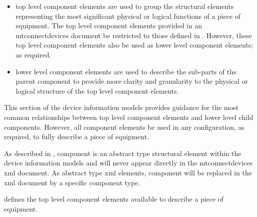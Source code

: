 \begin{itemize}

\item \gls{top level} \gls{component} elements are used to group the \glspl{structural element} representing the most significant physical or logical functions of a piece of equipment.  The \gls{top level} \gls{component} elements provided in an \gls{mtconnectdevices} document \should be restricted to those defined in .  However, these \gls{top level} \gls{component} elements \may also be used as \gls{lower level} \gls{component} elements; as required.

\item \gls{lower level} \gls{component} elements are used to describe the sub-parts of the parent \gls{component} to provide more clarity and granularity to the physical or logical structure of the \gls{top level} \gls{component} elements.
\end{itemize}

This section of the \glspl{device information model} provides guidance for the most common relationships between \gls{top level} \gls{component} elements and \gls{lower level} child components.  However, all \gls{component} elements \may be used in any configuration, as required, to fully describe a piece of equipment.

As described in , \gls{component} is an abstract type \gls{structural element} within the \glspl{device information model} and will never appear directly in the \gls{mtconnectdevices} \gls{xml} document.  As abstract type \gls{xml} elements, \gls{component} will be replaced in the \gls{xml} document by a specific \gls{component} type.

 defines the \gls{top level} \gls{component} elements available to describe a piece of equipment.



